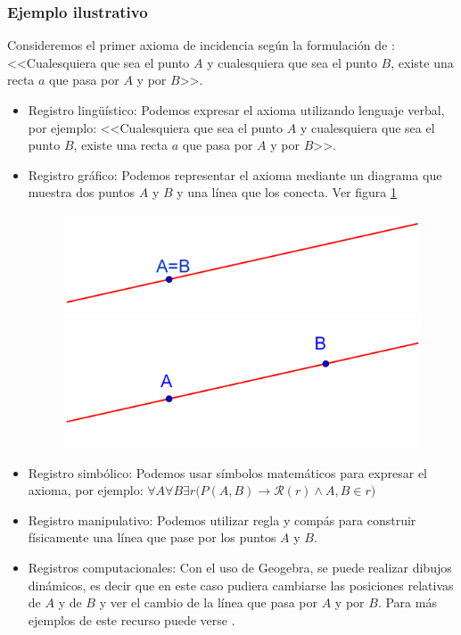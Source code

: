 \subsubsection{Ejemplo ilustrativo}

Consideremos el primer axioma de incidencia según la formulación de \textcite{efimov1984geometria11}: <<Cualesquiera que sea el punto $A$ y cualesquiera que sea el punto $B$, existe una recta $a$ que pasa por $A$ y por $B$>>. 
\begin{itemize}
	\item Registro lingüístico: Podemos expresar el axioma utilizando lenguaje verbal, por ejemplo: <<Cualesquiera que sea el punto $A$ y cualesquiera que sea el punto $B$, existe una recta $a$ que pasa por $A$ y por $B$>>.
	\item Registro gráfico: Podemos representar el axioma mediante un diagrama que muestra dos puntos $A$ y $B$ y una línea que los conecta. Ver figura \ref{fig:Axioma-I-de inciden}
	
	\begin{figure}[h!]
		\centering
		\caption{}
		\label{fig:Axioma-I-de inciden}
		\includegraphics[scale=0.2]{Trabajos/11/Envios/Ax1a.PNG}
		\includegraphics[scale=0.2]{Trabajos/11/Envios/Ax1b2b.PNG}
	\end{figure}
	
	\item Registro simbólico: Podemos usar símbolos matemáticos para expresar el axioma, por ejemplo: $\forall A \forall B \exists r \bigl( P(A,B) \rightarrow \mathcal{R}(r) \wedge A,B \in r \bigr)$
	
	\item Registro manipulativo: Podemos utilizar regla y compás para construir físicamente una línea que pase por los puntos $A$ y $B$.
	
	\item Registros computacionales: Con el uso de Geogebra, se puede realizar dibujos dinámicos, es decir que en este caso pudiera cambiarse las posiciones relativas de $A$ y de $B$ y ver el cambio de la línea que pasa por $A$ y por $B$. Para más ejemplos de este recurso puede verse \cite{geometria11congeogebra11}.
\end{itemize}


